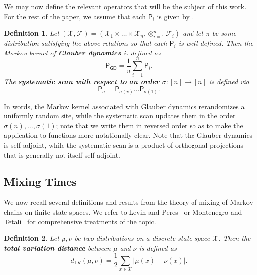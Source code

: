 \documentclass[11pt]{article}
\newtheorem{definition}{Definition}[section]
\begin{document}
We may now define the relevant operators that will be the subject of this work. For the rest of the paper, we assume that each $\mathsf{P}_i$ is given by .
\begin{definition}
    Let $(\mathcal{X},\mathcal{F})=(\mathcal{X}_1\times\ldots\times \mathcal{X}_n,\otimes_{i=1}^n \mathcal{F}_i)$ and let $\pi$ be some distribution satisfying the above relations so that each $\mathsf{P}_i$ is well-defined. Then the Markov kernel of \textbf{Glauber dynamics} is defined as
    \begin{equation*}
        \mathsf{P}_{\mathsf{GD}} = \frac{1}{n}\sum_{i=1}^n \mathsf{P}_i.
    \end{equation*}
    The \textbf{systematic scan with respect to an order $\sigma:[n]\to [n]$} is defined via
    \begin{equation*}
        \mathsf{P}_{\sigma} = \mathsf{P}_{\sigma(n)}\ldots \mathsf{P}_{\sigma(1)}.
    \end{equation*}
\end{definition}
In words, the Markov kernel associated with Glauber dynamics rerandomizes a uniformly random site, while the systematic scan updates them in the order $\sigma(n),\ldots,\sigma(1)$; note that we write them in reversed order so as to make the application to functions more notationally clear. Note that the Glauber dynamics is self-adjoint, while the systematic scan is a product of orthogonal projections that is generally not itself self-adjoint.

\subsection{Mixing Times}

We now recall several definitions and results from the theory of mixing of Markov chains on finite state spaces. We refer to Levin and Peres~\cite{levin2017markov} or Montenegro and Tetali~\cite{tetali} for comprehensive treatments of the topic. 

\begin{definition}
    Let $\mu,\nu$ be two distributions on a discrete state space $\mathcal{X}$. Then the \textbf{total variation distance} between $\mu$ and $\nu$ is defined as
    \begin{equation*}
        d_{\mathsf{TV}}(\mu,\nu)=\frac{1}{2}\sum_{x\in \mathcal{X}} \vert \mu(x)-\nu(x)\vert.
    \end{equation*}
\end{definition}
\end{document}
